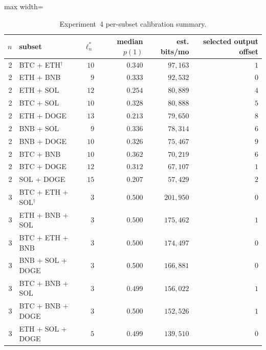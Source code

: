 \documentclass[11pt,titlepage,openany,oneside]{book}  %
\begin{document}
\begin{table}[!htbp]
  \caption{Experiment~4 per-subset calibration summary.}
  \label{tab:appendix-a7}
  \begin{center}
    \begin{adjustbox}{max width=\textwidth}
    \begin{tabular}{rlrrrr}
      \toprule
      $n$ & subset & $\ell^*_n$ & median $p(1)$ & est. bits/mo & selected output offset \\
      \midrule
      2 & BTC + ETH$^\dagger$                 & $10$ & $0.340$ & $97{,}163$  & $1$ \\
      2 & ETH + BNB                            & $9$  & $0.333$ & $92{,}532$  & $0$ \\
      2 & ETH + SOL                            & $12$ & $0.254$ & $80{,}889$  & $4$ \\
      2 & BTC + SOL                            & $10$ & $0.328$ & $80{,}888$  & $5$ \\
      2 & ETH + DOGE                           & $13$ & $0.213$ & $79{,}650$  & $8$ \\
      2 & BNB + SOL                            & $9$  & $0.336$ & $78{,}314$  & $6$ \\
      2 & BNB + DOGE                           & $10$ & $0.326$ & $75{,}467$  & $9$ \\
      2 & BTC + BNB                            & $10$ & $0.362$ & $70{,}219$  & $6$ \\
      2 & BTC + DOGE                           & $12$ & $0.312$ & $67{,}107$  & $1$ \\
      2 & SOL + DOGE                           & $15$ & $0.207$ & $57{,}429$  & $2$ \\
      \midrule
      3 & BTC + ETH + SOL$^\dagger$            & $3$  & $0.500$ & $201{,}950$ & $0$ \\
      3 & ETH + BNB + SOL                      & $3$  & $0.500$ & $175{,}462$ & $1$ \\
      3 & BTC + ETH + BNB                      & $3$  & $0.500$ & $174{,}497$ & $0$ \\
      3 & BNB + SOL + DOGE                     & $3$  & $0.500$ & $166{,}881$ & $0$ \\
      3 & BTC + BNB + SOL                      & $3$  & $0.499$ & $156{,}022$ & $1$ \\
      3 & BTC + BNB + DOGE                     & $3$  & $0.500$ & $152{,}526$ & $1$ \\
      3 & ETH + SOL + DOGE                     & $5$  & $0.499$ & $139{,}510$ & $0$ \\

\end{tabular}
\end{adjustbox}
\end{center}
\end{table}
\end{document}
